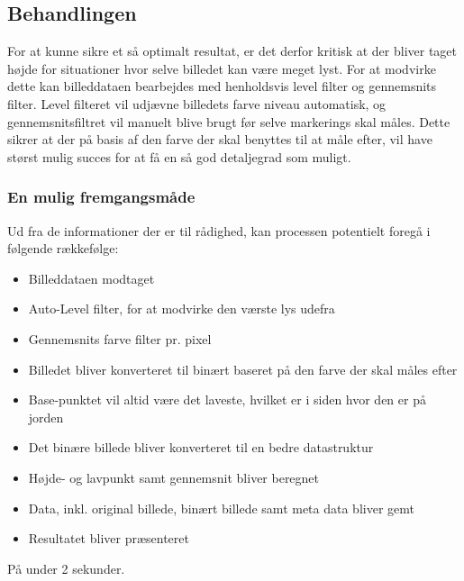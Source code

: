 \subsection{Behandlingen}
For at kunne sikre et så optimalt resultat, er det derfor kritisk at der bliver taget højde for situationer hvor selve billedet kan være meget lyst. For at modvirke dette kan billeddataen bearbejdes med henholdsvis level filter og gennemsnits filter. Level filteret vil udjævne billedets farve niveau automatisk, og gennemsnitsfiltret vil manuelt blive brugt før selve markerings skal måles. Dette sikrer at der på basis af den farve der skal benyttes til at måle efter, vil have størst mulig succes for at få en så god detaljegrad som muligt.

\subsubsection{En mulig fremgangsmåde}
Ud fra de informationer der er til rådighed, kan processen potentielt foregå i følgende rækkefølge:
\begin{itemize}
    \item Billeddataen modtaget
    \item Auto-Level filter, for at modvirke den værste lys udefra
    \item Gennemsnits farve filter pr. pixel
    \item Billedet bliver konverteret til binært baseret på den farve der skal måles efter
    \item Base-punktet vil altid være det laveste, hvilket er i siden hvor den er på jorden
    \item Det binære billede bliver konverteret til en bedre datastruktur
    \item Højde- og lavpunkt samt gennemsnit bliver beregnet
    \item Data, inkl. original billede, binært billede samt meta data bliver gemt
    \item Resultatet bliver præsenteret
\end{itemize}

På under 2 sekunder.